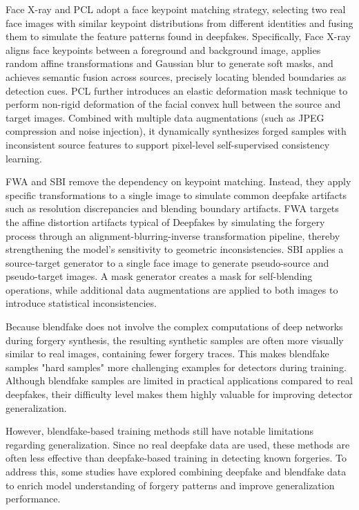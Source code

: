 \documentclass[final,5p,times]{elsarticle}
\begin{document}
Face X-ray \cite{15} and PCL \cite{17} adopt a face keypoint matching strategy, selecting two real face images with similar keypoint distributions from different identities and fusing them to simulate the feature patterns found in deepfakes. Specifically, Face X-ray \cite{15} aligns face keypoints between a foreground and background image, applies random affine transformations and Gaussian blur to generate soft masks, and achieves semantic fusion across sources, precisely locating blended boundaries as detection cues. PCL \cite{17} further introduces an elastic deformation mask technique to perform non-rigid deformation of the facial convex hull between the source and target images. Combined with multiple data augmentations (such as JPEG compression and noise injection), it dynamically synthesizes forged samples with inconsistent source features to support pixel-level self-supervised consistency learning.

FWA \cite{14} and SBI \cite{18} remove the dependency on keypoint matching. Instead, they apply specific transformations to a single image to simulate common deepfake artifacts such as resolution discrepancies and blending boundary artifacts. FWA \cite{14} targets the affine distortion artifacts typical of Deepfakes by simulating the forgery process through an alignment-blurring-inverse transformation pipeline, thereby strengthening the model's sensitivity to geometric inconsistencies. SBI \cite{18} applies a source-target generator to a single face image to generate pseudo-source and pseudo-target images. A mask generator creates a mask for self-blending operations, while additional data augmentations are applied to both images to introduce statistical inconsistencies.

Because blendfake does not involve the complex computations of deep networks during forgery synthesis, the resulting synthetic samples are often more visually similar to real images, containing fewer forgery traces. This makes blendfake samples "hard samples" more challenging examples for detectors during training. Although blendfake samples are limited in practical applications compared to real deepfakes, their difficulty level makes them highly valuable for improving detector generalization.

However, blendfake-based training methods still have notable limitations regarding generalization. Since no real deepfake data are used, these methods are often less effective than deepfake-based training in detecting known forgeries. To address this, some studies \cite{1,30} have explored combining deepfake and blendfake data to enrich model understanding of forgery patterns and improve generalization performance.
\end{document}
